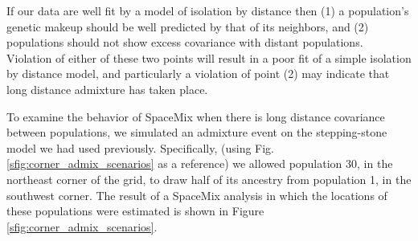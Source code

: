 \documentclass[12pt]{article}
\begin{document}

If our data are well fit by a model of isolation by distance then (1) a population's genetic makeup should be well predicted by that of its neighbors, and (2) populations should not show excess covariance with distant populations. Violation of either of these two points will result in a poor fit of a simple isolation by distance model, and particularly a violation of point (2) may indicate that long distance admixture has taken place.

To examine the behavior of SpaceMix when there is long distance covariance between populations, we simulated an admixture event on the stepping-stone model we had used previously.  Specifically, (using Fig. \ref{sfig:corner_admix_scenarios} as a reference) we allowed population 30, in the northeast corner of the grid, to draw half of its ancestry from population 1, in the southwest corner.  The result of a SpaceMix analysis in which the locations of these populations were estimated is shown in Figure \ref{sfig:corner_admix_scenarios}.
\end{document}

